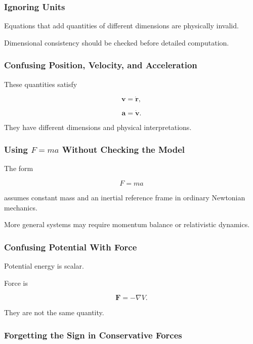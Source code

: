\subsubsection{Ignoring Units}

Equations that add quantities of different dimensions are physically
invalid.

Dimensional consistency should be checked before detailed computation.

\subsubsection{Confusing Position, Velocity, and Acceleration}

These quantities satisfy

\[
\mathbf{v}
=
\dot{\mathbf{r}},
\]

\[
\mathbf{a}
=
\dot{\mathbf{v}}.
\]

They have different dimensions and physical interpretations.

\subsubsection{Using \(F=ma\) Without Checking the Model}

The form

\[
F=ma
\]

assumes constant mass and an inertial reference frame in ordinary Newtonian
mechanics.

More general systems may require momentum balance or relativistic dynamics.

\subsubsection{Confusing Potential With Force}

Potential energy is scalar.

Force is

\[
\boxed{
\mathbf{F}
=
-\nabla V.
}
\]

They are not the same quantity.

\subsubsection{Forgetting the Sign in Conservative Forces}

